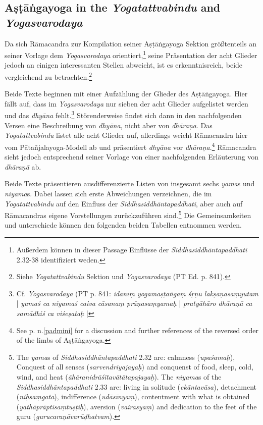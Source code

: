 \subsection{Aṣṭāṅgayoga in the \textit{Yogatattvabindu} and \textit{Yogasvarodaya}}

Da sich Rāmacandra zur Kompilation seiner Aṣṭāṅgayoga Sektion größtenteils an seiner Vorlage dem \textit{Yogasvarodaya} orientiert,\footnote{Außerdem können in dieser Passage Einflüsse der \emph{Siddhasiddhāntapaddhati} 2.32-38 identifiziert weden.} seine Präsentation der acht Glieder jedoch an einigen interessanten Stellen abweicht, ist es erkenntnisreich, beide vergleichend zu betrachten.\footnote{Siehe \emph{Yogatattvabindu} Sektion  und \textit{Yogasvarodaya} (PT Ed. p. 841).}

Beide Texte beginnen mit einer Aufzählung der Glieder des Aṣṭāṅgayoga. Hier fällt auf, dass im \emph{Yogasvarodaya} nur sieben der acht Glieder aufgelistet werden und das \textit{dhyāna} fehlt.\footnote{Cf. \textit{Yogasvarodaya} (PT p. 841: \textit{idānīṃ yogamaṣṭāṅgaṃ śṛṇu lakṣaṇasaṃyutam} | \textit{yamaś ca niyamaś caiva cāsanaṃ prāṇasaṃyamaḥ} | \textit{pratyāhāro dhāraṇā ca samādhiś ca viśeṣataḥ} |} Störenderweise findet sich dann in den nachfolgenden Versen eine Beschreibung von \textit{dhyāna}, nicht aber von \textit{dhāraṇa}. Das \textit{Yogatattvabindu} listet alle acht Glieder auf, allerdings weicht Rāmacandra hier vom Pātañjalayoga-Modell ab und präsentiert \textit{dhyāna} vor \textit{dhāraṇa}.\footnote{See p. n.\cref{padmini} for a discussion and further references of the reversed order of the limbs of Aṣṭāṅgayoga.} Rāmacandra sieht jedoch entsprechend seiner Vorlage von einer nachfolgenden Erläuterung von \textit{dhāraṇā} ab.

Beide Texte präsentieren ausdifferenzierte Listen von insgesamt sechs \textit{yama}s und \textit{niyama}s. Dabei lassen sich erste Abweichungen verzeichnen, die im \textit{Yogatattvabindu} auf den Einfluss der \emph{Siddhasiddhāntapaddhati}, aber auch auf Rāmacandras eigene Vorstellungen zurückzuführen sind.\footnote{The \textit{yama}s of \textit{Siddhasiddhāntapaddhati} 2.32 are: calmness (\textit{upaśamaḥ}), Conquest of all senses (\textit{sarvendriyajayaḥ}) and conquenst of food, sleep, cold, wind, and heat (\textit{āhāranidrāśītavātātapajayaḥ}). The \textit{niyama}s of the \textit{Siddhasiddhāntapaddhati} 2.33 are: living in solitude (\textit{ekāntavāsa}), detachment (\textit{niḥsaṃgata}), indifference (\textit{udāsīnyaṃ}), contentment with what is obtained (\textit{yathāprāptisaṃtuṣṭiḥ}), aversion (\textit{vairasyaṃ}) and dedication to the feet of the guru (\textit{gurucaraṇāvarūḍhatvam}).} Die Gemeinsamkeiten und unterschiede können den folgenden beiden Tabellen entnommen werden.

